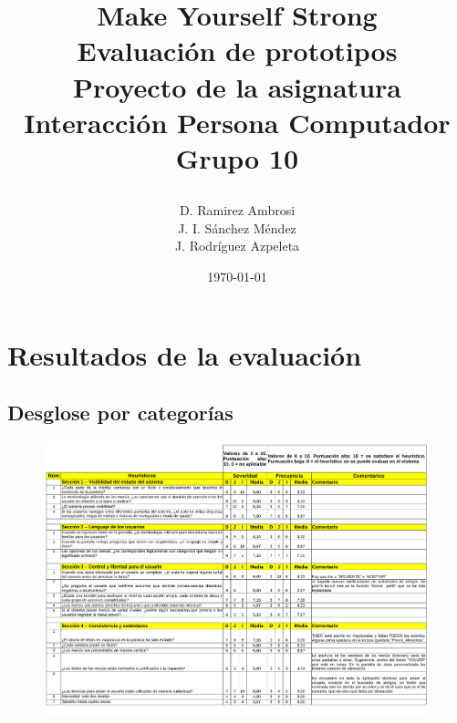 \documentclass[a4paper]{article}
\date{}
\author{D. Ramirez Ambrosi \\ J. I. Sánchez Méndez \\ J. Rodríguez Azpeleta}
\title{\begin{center}
\textbf{\Huge{Make Yourself Strong}} \\ Evaluación de prototipos  \\Proyecto de la asignatura Interacción Persona Computador \\ \Huge{Grupo 10}
\end{center}}
\date{\today}
\renewcommand\listfigurename{\centering LISTA DE FIGURAS}
\begin{document}
\maketitle

\thispagestyle{empty}%
\newpage
\tableofcontents%
\thispagestyle{empty}
\newpage





\setcounter{page}{1}%


\section{Resultados de la evaluación}

\subsection{Desglose por categorías}

\begin{figure}[!h]
\centering
\includegraphics[width=0.9\textheight,angle=90,page=1]{./figuras/checklist.pdf}
\end{figure}
\end{document}
